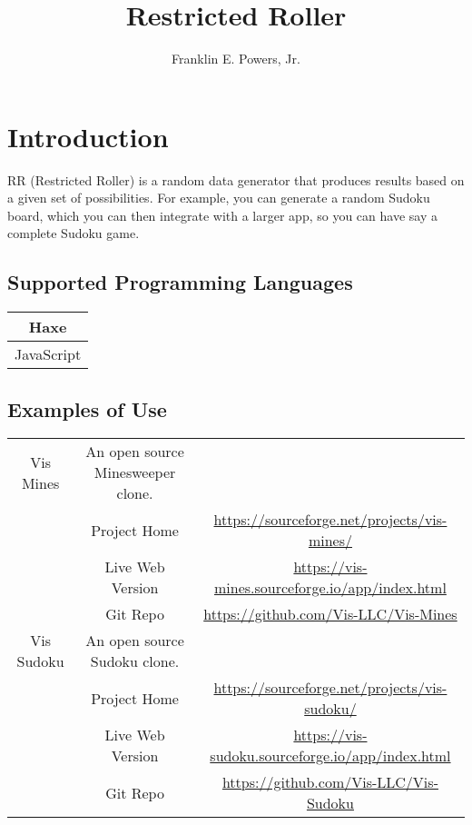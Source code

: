 \documentclass[11pt]{article}
\title{Restricted Roller}
\author{Franklin E. Powers, Jr.}
\begin{document}
\maketitle

\section{Introduction}
RR (Restricted Roller) is a random data generator that produces results based on a given set of possibilities.  For example, you can generate a random Sudoku board, which you can then integrate with a larger app, so you can have say a complete Sudoku game. \\

\subsection{Supported Programming Languages}
\begin{center}
\begin{tabular}{ | c | }
\hline
Haxe \\
\hline
JavaScript \\
\hline
\end{tabular}
\end{center}

\subsection{Examples of Use}
\begin{center}
\begin{tabular}{ | c | c | c | }
\hline
Vis Mines & An open source Minesweeper clone. \\
& Project Home & \href{https://sourceforge.net/projects/vis-mines/}{https://sourceforge.net/projects/vis-mines/} \\
& Live Web Version & \href{https://vis-mines.sourceforge.io/app/index.html}{https://vis-mines.sourceforge.io/app/index.html} \\
& Git Repo & \href{https://github.com/Vis-LLC/Vis-Mines}{https://github.com/Vis-LLC/Vis-Mines} \\
\hline
Vis Sudoku & An open source Sudoku clone. \\
& Project Home & \href{https://sourceforge.net/projects/vis-sudoku/}{https://sourceforge.net/projects/vis-sudoku/} \\
& Live Web Version & \href{https://vis-sudoku.sourceforge.io/app/index.html}{https://vis-sudoku.sourceforge.io/app/index.html} \\
& Git Repo & \href{https://github.com/Vis-LLC/Vis-Sudoku}{https://github.com/Vis-LLC/Vis-Sudoku} \\
\hline
\end{tabular}
\end{center}
\end{document}
